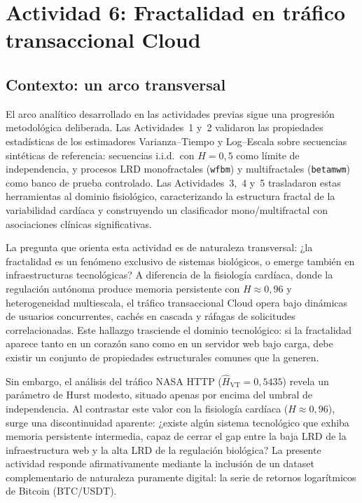 \newpage
\section{Actividad 6: Fractalidad en tráfico transaccional Cloud}

\subsection{Contexto: un arco transversal}

El arco analítico desarrollado en las actividades previas sigue una progresión
metodológica deliberada. Las Actividades~1 y~2 validaron las propiedades
estadísticas de los estimadores Varianza--Tiempo y Log--Escala sobre secuencias
sintéticas de referencia: secuencias i.i.d.\ con $H=0{,}5$ como límite de
independencia, y procesos LRD monofractales (\texttt{wfbm}) y multifractales
(\texttt{betamwm}) como banco de prueba controlado. Las Actividades~3,~4 y~5
trasladaron estas herramientas al dominio fisiológico, caracterizando la
estructura fractal de la variabilidad cardíaca y construyendo un clasificador
mono/multifractal con asociaciones clínicas significativas.

La pregunta que orienta esta actividad es de naturaleza transversal: ¿la
fractalidad es un fenómeno exclusivo de sistemas biológicos, o emerge también en
infraestructuras tecnológicas? A diferencia de la fisiología cardíaca, donde la
regulación autónoma produce memoria persistente con $H\approx0{,}96$ y
heterogeneidad multiescala, el tráfico transaccional Cloud opera bajo dinámicas
de usuarios concurrentes, cachés en cascada y ráfagas de solicitudes
correlacionadas. Este hallazgo trasciende el dominio tecnológico: si la
fractalidad aparece tanto en un corazón sano como en un servidor web bajo carga,
debe existir un conjunto de propiedades estructurales comunes que la generen.

Sin embargo, el análisis del tráfico NASA HTTP ($\hat{H}_{\text{VT}} = 0{,}5435$)
revela un parámetro de Hurst modesto, situado apenas por encima del umbral de
independencia. Al contrastar este valor con la fisiología cardíaca
($H\approx0{,}96$), surge una discontinuidad aparente: ¿existe algún sistema
tecnológico que exhiba memoria persistente intermedia, capaz de cerrar el gap
entre la baja LRD de la infraestructura web y la alta LRD de la regulación
biológica? La presente actividad responde afirmativamente mediante la inclusión
de un dataset complementario de naturaleza puramente digital: la serie de
retornos logarítmicos de Bitcoin (BTC/USDT).

